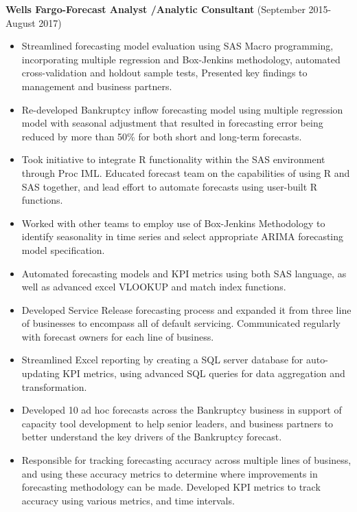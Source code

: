 \documentclass[a4paper,10pt]{article}
\begin{document}
\noindent
\textbf{Wells Fargo-Forecast Analyst /Analytic Consultant} (September 2015-August 2017) 
\begin{itemize}
\item Streamlined forecasting model evaluation using SAS Macro programming, incorporating multiple regression and Box-Jenkins methodology, automated cross-validation and holdout sample tests, Presented key findings to management and business partners.
\item Re-developed Bankruptcy inflow forecasting model using multiple regression model with seasonal adjustment that resulted in forecasting error being reduced by more than 50\% for both short and long-term forecasts. 
\item Took initiative to integrate R functionality within the SAS environment through Proc IML.  Educated forecast team on the capabilities of using R and SAS together, and lead effort to automate forecasts using user-built R functions.
\item Worked with other teams to employ use of Box-Jenkins Methodology to identify seasonality in time series and select appropriate ARIMA forecasting model specification.
\item Automated forecasting models and KPI metrics using both SAS language, as well as advanced excel VLOOKUP and match index functions.
\item Developed Service Release forecasting process and expanded it from three line of businesses to encompass all of default servicing.  Communicated regularly with forecast owners for each line of business.
\item Streamlined Excel reporting by creating a SQL server database for auto-updating KPI metrics, using advanced SQL queries for data aggregation and transformation.
\item Developed 10 ad hoc forecasts across the Bankruptcy business in support of capacity tool development to help senior leaders, and business partners to better understand the key drivers of the Bankruptcy forecast.
\item Responsible for tracking forecasting accuracy across multiple lines of business, and using these accuracy metrics to determine where improvements in forecasting methodology can be made. Developed KPI metrics to track accuracy using various metrics, and time intervals. 
\end{itemize}
\end{document}
